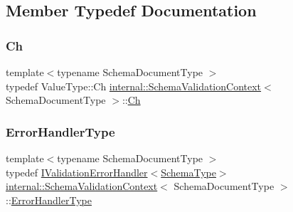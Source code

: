 \subsection{Member Typedef Documentation}
\mbox{\label{structinternal_1_1SchemaValidationContext_abd905cd1513b117f1db68b58d6c41daf}} 
\subsubsection{\texorpdfstring{Ch}{Ch}}
{\footnotesize\ttfamily template$<$typename Schema\+Document\+Type $>$ \\
typedef Value\+Type\+::\+Ch \hyperlink{structinternal_1_1SchemaValidationContext}{internal\+::\+Schema\+Validation\+Context}$<$ Schema\+Document\+Type $>$\+::\hyperlink{structinternal_1_1SchemaValidationContext_abd905cd1513b117f1db68b58d6c41daf}{Ch}}

\mbox{\label{structinternal_1_1SchemaValidationContext_a4d015d68e8957c254b84af5f3550b2f3}} 
\subsubsection{\texorpdfstring{Error\+Handler\+Type}{ErrorHandlerType}}
{\footnotesize\ttfamily template$<$typename Schema\+Document\+Type $>$ \\
typedef \hyperlink{classinternal_1_1IValidationErrorHandler}{I\+Validation\+Error\+Handler}$<$\hyperlink{structinternal_1_1SchemaValidationContext_a79b155ab3711b97b6e33ced450614397}{Schema\+Type}$>$ \hyperlink{structinternal_1_1SchemaValidationContext}{internal\+::\+Schema\+Validation\+Context}$<$ Schema\+Document\+Type $>$\+::\hyperlink{structinternal_1_1SchemaValidationContext_a4d015d68e8957c254b84af5f3550b2f3}{Error\+Handler\+Type}}

\mbox{\label{structinternal_1_1SchemaValidationContext_a79b155ab3711b97b6e33ced450614397}} 
